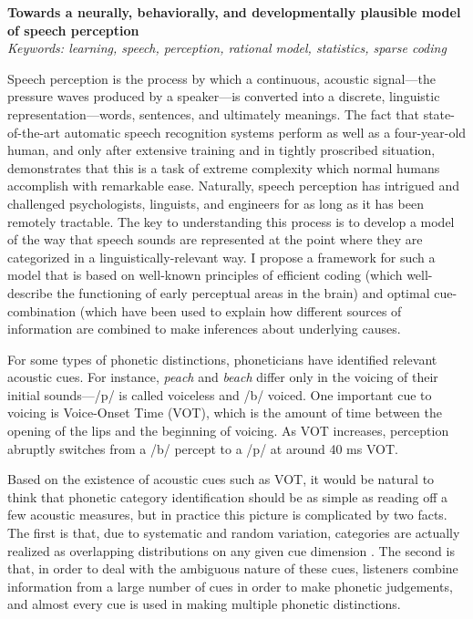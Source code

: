 \documentclass[12pt]{article}
\begin{document}
\begin{center}
  \textbf{Towards a neurally, behaviorally, and developmentally plausible model of speech perception}
  \\
 \textit{Keywords: learning, speech, perception, rational model, statistics, sparse coding}
\end{center}

\vspace{-1em}

Speech perception is the process by which a continuous, acoustic signal---the pressure waves produced by a speaker---is converted into a discrete, linguistic representation---words, sentences, and ultimately meanings.  The fact that state-of-the-art automatic speech recognition systems perform as well as a four-year-old human, and only after extensive training and in tightly proscribed situation, demonstrates that this is a task of extreme complexity which normal humans accomplish with remarkable ease.  Naturally, speech perception has intrigued and challenged psychologists, linguists, and engineers for as long as it has been remotely tractable.  The key to understanding this process is to develop a model of the way that speech sounds are represented at the point where they are categorized in a linguistically-relevant way.  I propose a framework for such a model that is based on well-known principles of efficient coding (which well-describe the functioning of early perceptual areas in the brain) and optimal cue-combination (which have been used to explain how different sources of information are combined to make inferences about underlying causes.

For some types of phonetic distinctions, phoneticians have identified relevant acoustic cues.  For instance, \emph{peach} and \emph{beach} differ only in the voicing of their initial sounds---/p/ is called voiceless and /b/ voiced.  One important cue to voicing is Voice-Onset Time (VOT), which is the amount of time between the opening of the lips and the beginning of voicing.  As VOT increases, perception abruptly switches from a /b/ percept to a /p/ at around 40 ms VOT.

Based on the existence of acoustic cues such as VOT, it would be natural to think that phonetic category identification should be as simple as reading off a few acoustic measures, but in practice this picture is complicated by two facts.  The first is that, due to systematic and random variation, categories are actually realized as overlapping distributions on any given cue dimension \cite{Hillenbrand1995}.  The second is that, in order to deal with the ambiguous nature of these cues, listeners combine information from a large number of cues in order to make phonetic judgements, and almost every cue is used in making multiple phonetic distinctions.  
\end{document}
